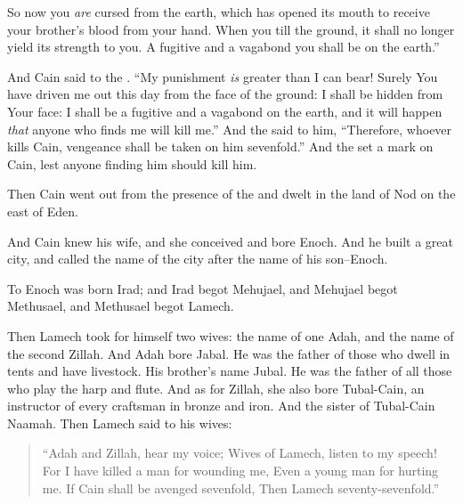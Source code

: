 \bverse So now you \textit{are} cursed from the earth, which has opened its mouth to receive your brother's blood from your hand.
\bverse When you till the ground, it shall no longer yield its strength to you. A fugitive and a vagabond you shall be on the earth.''
	
\bverse And Cain said to the \lord. ``My punishment \textit{is} greater than I can bear!
\bverse Surely You have driven me out this day from the face of the ground: I shall be hidden from Your face: I shall be a fugitive and a vagabond on the earth, and it will happen \textit{that} anyone who finds me will kill me.''
\bverse And the \lord said to him, ``Therefore, whoever kills Cain, vengeance shall be taken on him sevenfold.'' And the \lord set a mark on Cain, lest anyone finding him should kill him.


\bverse Then Cain went out from the presence of the \lord and dwelt in the land of Nod on the east of Eden.

\bverse And Cain knew his wife, and she conceived and bore Enoch. And he built a great city, and called the name of the city after the name of his son--Enoch.
	
\bverse To Enoch was born Irad; and Irad begot Mehujael, and Mehujael begot Methusael, and Methusael begot Lamech.

\bverse Then Lamech took for himself two wives: the name of one \was Adah, and the name of the second \was Zillah.
\bverse And Adah bore Jabal. He was the father of those who dwell in tents and have livestock.
\bverse His brother's name \was Jubal. He was the father of all those who play the harp and flute.
\bverse And as for Zillah, she also bore Tubal-Cain, an instructor of every craftsman in bronze and iron. And the sister of Tubal-Cain \was Naamah.
\bverse Then Lamech said to his wives:
\begin{quotation}
``Adah and Zillah, hear my voice; Wives of Lamech, listen to my speech! For I have killed a man for wounding me, Even a young man for hurting me. \bverse If Cain shall be avenged sevenfold, Then Lamech seventy-sevenfold.''
\end{quotation}

